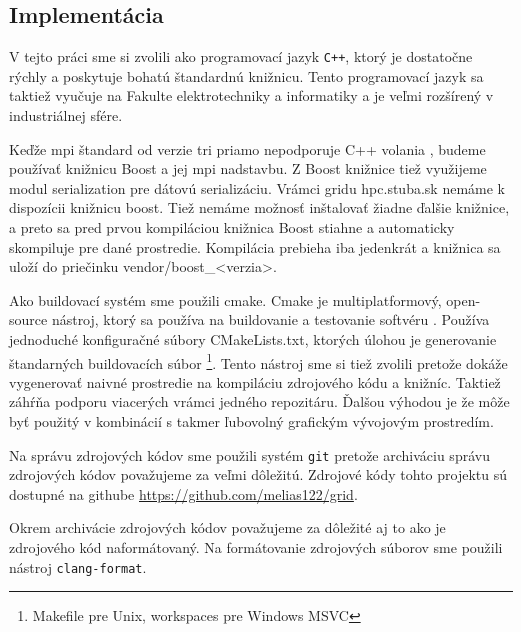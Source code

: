 \subsection{Implementácia}
V tejto práci sme si zvolili ako programovací jazyk \texttt{C++}, ktorý je dostatočne rýchly a poskytuje bohatú štandardnú knižnicu.
Tento programovací jazyk sa taktiež vyučuje na Fakulte elektrotechniky a informatiky a je veľmi rozšírený v industriálnej sfére.

Keďže \acrshort{mpi} štandard od verzie tri priamo nepodporuje C++ volania \cite{mpi3-1},
budeme používať knižnicu Boost a jej \acrshort{mpi} nadstavbu. Z Boost knižnice tiež využijeme modul serialization pre dátovú serializáciu.
Vrámci gridu hpc.stuba.sk nemáme k dispozícii knižnicu boost. Tiež nemáme možnosť inštalovať žiadne ďalšie knižnice,
a preto sa pred prvou kompiláciou knižnica Boost stiahne a automaticky skompiluje pre dané prostredie.
Kompilácia prebieha iba jedenkrát a knižnica sa uloží do priečinku vendor/boost\_<verzia>.

Ako buildovací systém sme použili cmake.
Cmake je multiplatformový, open-source nástroj, ktorý sa používa na buildovanie a testovanie softvéru \cite{cmake-doc}.
Používa jednoduché konfiguračné súbory CMakeLists.txt, ktorých úlohou je generovanie štandarných buildovacích súbor \footnote{Makefile pre Unix, workspaces pre Windows MSVC}. Tento nástroj sme si tiež zvolili pretože dokáže vygenerovať naivné prostredie na kompiláciu zdrojového kódu a knižníc.
Taktiež záhŕňa podporu viacerých  vrámci jedného repozitáru.
Ďalšou výhodou je že môže byť použitý v kombinácií s takmer ľubovolný grafickým vývojovým prostredím.

Na správu zdrojových kódov sme použili systém \texttt{git} pretože archiváciu správu zdrojových kódov považujeme za veľmi dôležitú.
Zdrojové kódy tohto projektu sú dostupné na githube \url{https://github.com/melias122/grid}.

Okrem archivácie zdrojových kódov považujeme za dôležité aj to ako je zdrojového kód naformátovaný.
Na formátovanie zdrojových súborov sme použili nástroj \texttt{clang-format}.


